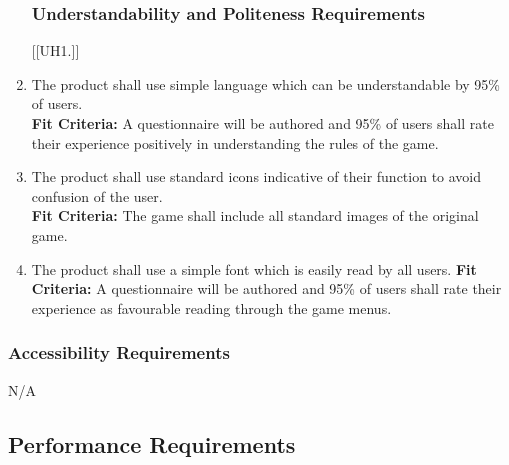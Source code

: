 \documentclass[12pt, titlepage]{article}
\begin{document}
\begin{enumerate}[{UH}1. ]
\subsubsection{Understandability and Politeness Requirements}
[{[{UH}1.]}]
    \item The product shall use simple language which can be understandable by 95\% of users.\\
    \textbf{Fit Criteria:} A questionnaire will be authored and 95\% of users shall rate their experience positively in understanding the rules of the game.
    \item The product shall use standard icons indicative of their function to avoid confusion of the user.\\
    \textbf{Fit Criteria:} The game shall include all standard images of the original game.
    \item The product shall use a simple font which is easily read by all users.
    \textbf{Fit Criteria:} A questionnaire will be authored and 95\% of users shall rate their experience as favourable reading through the game menus.
\end{enumerate}

\subsubsection{Accessibility Requirements}
N/A



\subsection{Performance Requirements}
\end{document}
